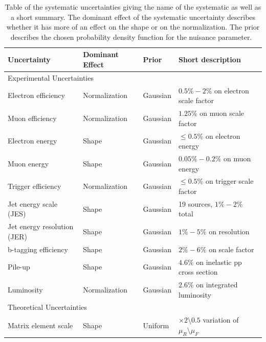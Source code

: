 \begin{table}[htbp!]
\begin{center}
\caption{Table of the systematic uncertainties giving the name of the systematic as well as a short summary.
The dominant effect of the systematic uncertainty describes whether it has more of an effect on the shape or on the normalization.
The prior describes the chosen probability density function for the nuisance parameter.~\label{tab:syst_sum}}
\begin{tabular}{l|l|l|l}
Uncertainty                           & Dominant Effect    & Prior    &   Short description                  \\
\hline
\multicolumn{4}{l}{Experimental Uncertainties}                                                     \\
\hline
Electron efficiency                   & Normalization      & Gaussian & $0.5\%-2\%$  on electron scale factor \\
Muon efficiency                       & Normalization      & Gaussian & $1.25\%$ on muon scale factor  \\
Electron energy                       & Shape              & Gaussian & $\leq 0.5\%$ on electron energy \\
Muon energy                           & Shape              & Gaussian & $0.05\%-0.2\%$ on muon energy \\
Trigger efficiency                    & Normalization      & Gaussian & $\leq 0.5\%$ on trigger scale factor \\
Jet energy scale (JES)                & Shape              & Gaussian & 19 sources, $1\%-2\%$ total \\
Jet energy resolution (JER)           & Shape              & Gaussian & $1\%-5\%$ on resolution        \\
b-tagging efficiency                  & Shape              & Gaussian & $2\%-6\%$ on scale factor      \\
Pile-up                               & Shape              & Gaussian & $4.6\%$ on inelastic pp cross section \\
Luminosity                            & Normalization      & Gaussian & $2.6\%$ on integrated luminosity \\
\hline
\multicolumn{4}{l}{Theoretical Uncertainties}                                                     \\
\hline
Matrix element scale                  & Shape              & Uniform  & $\times 2\setminus0.5$ variation of $\mu_R\setminus\mu_F$ \\ 

\end{tabular}
\end{center}
\end{table}

